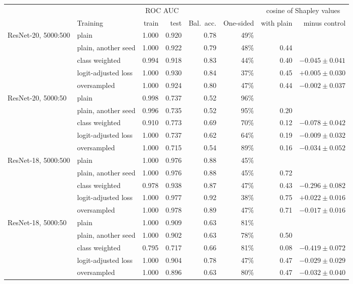 \begin{tabular}{@{}llrrrrrr@{}}
  \toprule
   &  & \multicolumn{2}{c}{ROC AUC} &  &  & \multicolumn{2}{c}{cosine of Shapley values} \\
  \cmidrule(lr){3-4} \cmidrule(lr){7-8}
   & Training & train & test & Bal.\ acc. & One-sided & with plain & minus control \\
  \midrule
  ResNet-20, 5000:500 & plain & 1.000 & 0.920 & 0.78 & 49\% &  &  \\
   & plain, another seed & 1.000 & 0.922 & 0.79 & 48\% & 0.44 &  \\
   & class weighted & 0.994 & 0.918 & 0.83 & 44\% & 0.40 & $-0.045 \pm 0.041$ \\
   & logit-adjusted loss & 1.000 & 0.930 & 0.84 & 37\% & 0.45 & $+0.005 \pm 0.030$ \\
   & oversampled & 1.000 & 0.924 & 0.80 & 47\% & 0.44 & $-0.002 \pm 0.037$ \\
  \midrule
  ResNet-20, 5000:50 & plain & 0.998 & 0.737 & 0.52 & 96\% &  &  \\
   & plain, another seed & 0.996 & 0.735 & 0.52 & 95\% & 0.20 &  \\
   & class weighted & 0.910 & 0.773 & 0.69 & 70\% & 0.12 & $-0.078 \pm 0.042$ \\
   & logit-adjusted loss & 1.000 & 0.737 & 0.62 & 64\% & 0.19 & $-0.009 \pm 0.032$ \\
   & oversampled & 1.000 & 0.715 & 0.54 & 89\% & 0.16 & $-0.034 \pm 0.052$ \\
  \midrule
  ResNet-18, 5000:500 & plain & 1.000 & 0.976 & 0.88 & 45\% &  &  \\
   & plain, another seed & 1.000 & 0.976 & 0.88 & 45\% & 0.72 &  \\
   & class weighted & 0.978 & 0.938 & 0.87 & 47\% & 0.43 & $-0.296 \pm 0.082$ \\
   & logit-adjusted loss & 1.000 & 0.977 & 0.92 & 38\% & 0.75 & $+0.022 \pm 0.016$ \\
   & oversampled & 1.000 & 0.978 & 0.89 & 47\% & 0.71 & $-0.017 \pm 0.016$ \\
  \midrule
  ResNet-18, 5000:50 & plain & 1.000 & 0.909 & 0.63 & 81\% &  &  \\
   & plain, another seed & 1.000 & 0.902 & 0.63 & 78\% & 0.50 &  \\
   & class weighted & 0.795 & 0.717 & 0.66 & 81\% & 0.08 & $-0.419 \pm 0.072$ \\
   & logit-adjusted loss & 1.000 & 0.904 & 0.78 & 47\% & 0.47 & $-0.029 \pm 0.029$ \\
   & oversampled & 1.000 & 0.896 & 0.63 & 80\% & 0.47 & $-0.032 \pm 0.040$ \\
  \bottomrule
\end{tabular}
